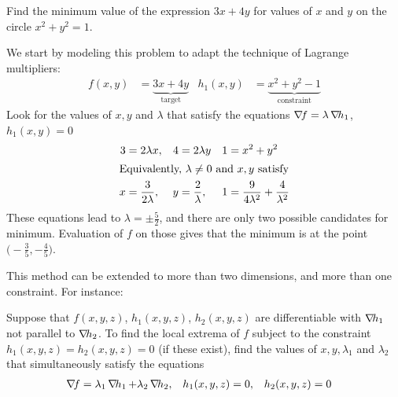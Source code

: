 \begin{example}
Find the minimum value of the expression $3x+4y$ for values of $x$ and $y$ on the circle $x^2+y^2=1$.

We start by modeling this problem to adapt the technique of Lagrange multipliers:
\begin{align*}
f(x,y) &= \underbrace{3x+4y}_{\text{target}} & h_1(x,y)&=\underbrace{x^2+y^2-1}_{\text{constraint}}
\end{align*}
Look for the values of $x,y$ and $\lambda$ that satisfy the equations $\mathop{\nabla\! {f}} = \lambda\mathop{\nabla\! {h_1}}$, $h_1(x,y)=0$
\begin{align*}
3 &= 2\lambda x, & 4 &= 2\lambda y & 1 &= x^2+y^2 \\
\intertext{Equivalently, $\lambda \neq 0$ and $x,y$ satisfy}
x &= \frac{3}{2\lambda}, & y &= \frac{2}{\lambda}, &1 &= \frac{9}{4\lambda^2}+\frac{4}{\lambda^2}
\end{align*}
These equations lead to $\lambda = \pm \frac{5}{2}$, and there are only two possible candidates for minimum. Evaluation of $f$ on those gives that the minimum is at the point $\big(-\frac{3}{5}, -\frac{4}{5} \big)$.
\end{example}

This method can be extended to more than two dimensions, and more than one constraint.  For instance:
\begin{theorem}\label{theorem:LM2C}
Suppose that $f(x,y,z)$, $h_1(x,y,z)$, $h_2(x,y,z)$ are differentiable with $\mathop{\nabla\! {h_1}}$ not parallel to $\mathop{\nabla\! {h_2}}$.  To find the local extrema of $f$ subject to the constraint $h_1(x,y,z)=h_2(x,y,z)=0$ (if these exist), find the values of $x,y, \lambda_1$ and $\lambda_2$ that simultaneously satisfy the equations
\begin{align*}
\mathop{\nabla\! {f}} &= \lambda_1 \mathop{\nabla\! {h_1}}+\lambda_2 \mathop{\nabla\! {h_2}}, & h_1(x,y,z)&=0, & h_2(x,y,z)&=0
\end{align*}
\end{theorem}

